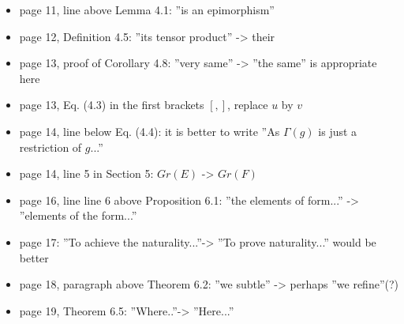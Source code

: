 \documentclass[12pt]{article}
\begin{document}
\begin{itemize}
\item page 11, line above Lemma 4.1: ''is an epimorphism''

\item page 12, Definition 4.5: ''its tensor product'' -> their

\item page 13, proof of Corollary 4.8: ''very same'' -> ''the same'' is appropriate here

\item page 13, Eq. (4.3) in the first brackets $[,]$, replace $u$ by $v$

\item page 14, line below Eq. (4.4): it is better to write ''As $\Gamma(g)$ is just a
restriction of $g$...''

\item page 14, line 5 in Section 5: $Gr(E)$ -> $Gr(F)$

\item page 16, line line 6 above Proposition 6.1: ''the elements of form...'' -> ''elements of
the form...''

\item page 17: ''To achieve the naturality...''-> ''To prove naturality...'' would be
better

\item page 18, paragraph above Theorem 6.2: ''we subtle'' -> perhaps ''we refine''(?)

\item page 19, Theorem 6.5: ''Where..''-> ''Here...''
\end{itemize}
\end{document}
